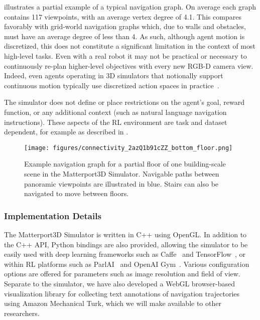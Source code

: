 \documentclass[10pt,twocolumn,letterpaper]{article}
\begin{document}
 illustrates a partial example of a typical navigation graph. On average each graph contains 117 viewpoints, with an average vertex degree of 4.1. This compares favorably with grid-world navigation graphs which, due to walls and obstacles, must have an average degree of less than 4. As such, although agent motion is discretized, this does not constitute a significant limitation in the context of most high-level tasks. Even with a real robot it may not be practical or necessary to continuously re-plan higher-level objectives with every new RGB-D camera view. Indeed, even agents operating in 3D simulators that notionally support continuous motion typically use discretized action spaces in practice~\cite{zhu2017icra, embodiedqa,iqa,savva2017minos}.

The simulator does not define or place restrictions on the agent's goal, reward function, or any additional context (such as natural language navigation instructions). These aspects of the RL environment are task and dataset dependent, for example as described in .

\begin{figure}[t]
	\begin{center}
		\texttt{[image: figures/connectivity\_2azQ1b91cZZ\_bottom\_floor.png]}
	\end{center}
	\caption{Example navigation graph for a partial floor of one building-scale scene in the Matterport3D Simulator. Navigable paths between panoramic viewpoints are illustrated in blue. Stairs can also be navigated to move between floors.}
	\label{fig:connectivity}
\end{figure}

\subsubsection{Implementation Details}

The Matterport3D Simulator is written in C++ using OpenGL. In addition to the C++ API, Python bindings are also provided, allowing the simulator to be easily used with deep learning frameworks such as Caffe~\cite{jia2014caffe} and TensorFlow~\cite{abadi2016tensorflow}, or within RL platforms such as ParlAI~\cite{parlai} and OpenAI Gym~\cite{openaigym}. Various configuration options are offered for parameters such as image resolution and field of view. Separate to the simulator, we have also developed a WebGL browser-based visualization library for collecting text annotations of navigation trajectories using Amazon Mechanical Turk, which we will make available to other researchers.
\end{document}
